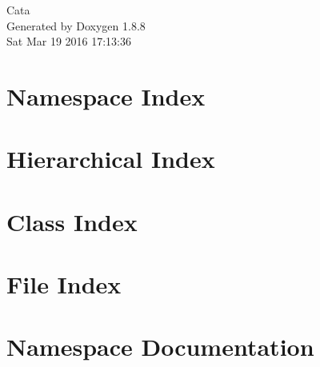 \documentclass[twoside]{book}
\newcommand{\+}{\discretionary{\mbox{\scriptsize$\hookleftarrow$}}{}{}}
\newcommand{\clearemptydoublepage}{%
  \newpage{\pagestyle{empty}\cleardoublepage}%
}
\begin{document}
\hypersetup{pageanchor=false,
             bookmarks=true,
             bookmarksnumbered=true,
             pdfencoding=unicode
            }
\begin{titlepage}
\vspace*{7cm}
\begin{center}%
{\Large Cata }\\
\vspace*{1cm}
{\large Generated by Doxygen 1.8.8}\\
\vspace*{0.5cm}
{\small Sat Mar 19 2016 17:13:36}\\
\end{center}
\end{titlepage}
\clearemptydoublepage
\tableofcontents
\clearemptydoublepage
{}
\hypersetup{pageanchor=true}

\chapter{Namespace Index}

\chapter{Hierarchical Index}

\chapter{Class Index}

\chapter{File Index}

\chapter{Namespace Documentation}
















\end{document}
